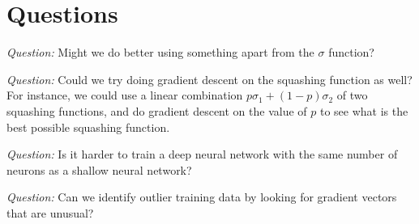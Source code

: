 \documentclass[12pt]{article}
\begin{document}
\section{Questions}

\emph{Question:} Might we do better using something apart from the
$\sigma$ function?

\emph{Question:} Could we try doing gradient descent on the squashing
function as well?  For instance, we could use a linear combination $p
\sigma_1+(1-p) \sigma_2$ of two squashing functions, and do gradient
descent on the value of $p$ to see what is the best possible squashing
function.

\emph{Question:} Is it harder to train a deep neural network with the
same number of neurons as a shallow neural network?

\emph{Question:} Can we identify outlier training data by looking for
gradient vectors that are unusual?
\end{document}
